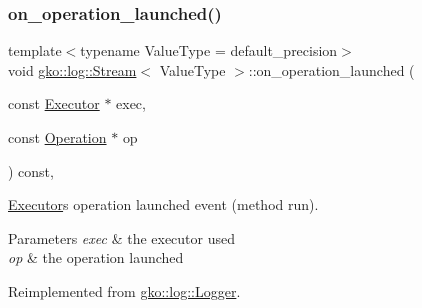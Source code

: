 \subsubsection{\texorpdfstring{on\+\_\+operation\+\_\+launched()}{on\_operation\_launched()}}
{\footnotesize\ttfamily template$<$typename Value\+Type  = default\+\_\+precision$>$ \\
void \hyperlink{classgko_1_1log_1_1Stream}{gko\+::log\+::\+Stream}$<$ Value\+Type $>$\+::on\+\_\+operation\+\_\+launched (\begin{DoxyParamCaption}\item[{const \hyperlink{classgko_1_1Executor}{Executor} $\ast$}]{exec,  }\item[{const \hyperlink{classgko_1_1Operation}{Operation} $\ast$}]{op }\end{DoxyParamCaption}) const\hspace{0.3cm}{\ttfamily [override]}, {\ttfamily [virtual]}}



\hyperlink{classgko_1_1Executor}{Executor}\textquotesingle{}s operation launched event (method run). 


\begin{DoxyParams}{Parameters}
{\em exec} & the executor used \\
\hline
{\em op} & the operation launched \\
\hline
\end{DoxyParams}


Reimplemented from \hyperlink{classgko_1_1log_1_1Logger}{gko\+::log\+::\+Logger}.

\mbox{\label{classgko_1_1log_1_1Stream_a71fdba2595d093b41bbd1b8b96b5c84a}} 

